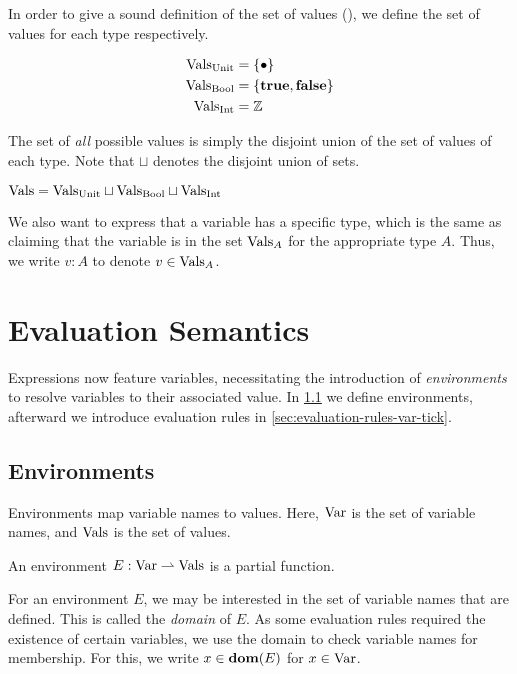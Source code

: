 In order to give a sound definition of the set of values (\Vals), we define the set of values for each type respectively. 

\begin{align*}
   \text{Vals}_{\text{Unit}} & = \{\bullet\} \\
   \text{Vals}_{\text{Bool}} & = \{\mathbf{true}, \mathbf{false}\} \\
   \text{Vals}_{\text{Int}} & = \mathbb{Z}
\end{align*}

The set of \emph{all} possible values is simply the disjoint union of the set of values of each type. Note that \(\sqcup\) denotes the disjoint union of sets.

\begin{definition}\label{def:vals}
   \(\text{Vals} = \text{Vals}_{\text{Unit}} \sqcup \text{Vals}_{\text{Bool}} \sqcup \text{Vals}_{\text{Int}}\)
\end{definition}

We also want to express that a variable has a specific type, which is the same as claiming that the variable is in the set \(\text{Vals}_{A}\) for the appropriate type \(A\). Thus, we write \(v : A\) to denote \(v \in \text{Vals}_{A}\).


\section{Evaluation Semantics}

Expressions now feature variables, necessitating the introduction of \emph{environments} to resolve variables to their associated value. In \cref{sec:environments} we define environments, afterward we introduce evaluation rules in \cref{sec:evaluation-rules-var-tick}.

\subsection{Environments}\label{sec:environments}

Environments map variable names to values. Here, \(\text{Var}\) is the set of variable names, and \(\text{Vals}\) is the set of values. 

\begin{definition}[Environment]\label{def:environment}
   An environment \(E: \text{Var} \rightharpoonup \text{\ensuremath{\text{Vals}}}\) is a partial function.
\end{definition}

For an environment \(E\), we may be interested in the set of variable names that are defined. This is called the \emph{domain} of \(E\). As some evaluation rules required the existence of certain variables, we use the domain to check variable names for membership. For this, we write \(x \in \textbf{dom}(E)\) for \(x \in \text{Var}\).

